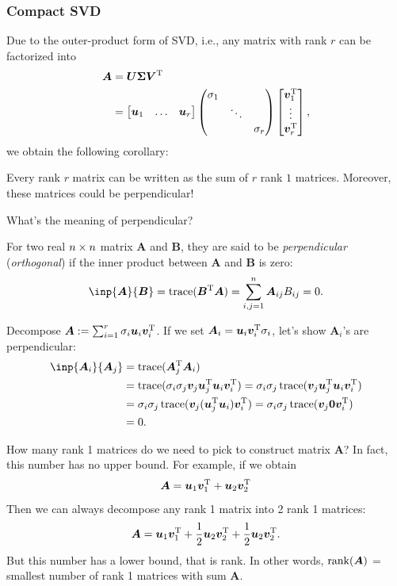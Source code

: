 \subsubsection{Compact SVD}
Due to the outer-product form of SVD, i.e., any matrix with rank $r$ can be factorized into
\begin{align*}
\bm A&=\bm U\bm\Sigma\bm V^{\mathrm T}\\
&=\begin{bmatrix}
\bm u_1&\dots&\bm u_r
\end{bmatrix}\begin{pmatrix}
\sigma_1&&\\&\ddots&\\&&\sigma_r
\end{pmatrix}\begin{bmatrix}
\bm v_1^{\mathrm T}\\\vdots\\\bm v_r^{\mathrm T}
\end{bmatrix},
\end{align*}
we obtain the following corollary:
\begin{corollary}
Every rank $r$ matrix can be written as the sum of $r$ rank $1$ matrices. Moreover, these matrices could be perpendicular!
\end{corollary}
What's the meaning of perpendicular?
\begin{definition}
For two real $n\times n$ matrix $\bm A$ and $\bm B$, they are said to be \emph{perpendicular} (\emph{orthogonal}) if the inner product between $\bm A$ and $\bm B$ is zero:
\[
\inp{\bm A}{\bm B}=\trace(\bm B\trans\bm A)=\sum_{i,j=1}^{n}\bm A_{ij}B_{ij}=0.
\]
\end{definition}
Decompose $\bm A:=\sum_{i=1}^{r}\sigma_i\bm u_i\bm v_i^{\mathrm T}$. If we set $\bm A_i=\bm u_i\bm v_i^{\mathrm T}\sigma_i$, let's show $\bm A_i$'s are perpendicular:
\begin{align*}
\inp{\bm A_i}{\bm A_j}&=\trace(\bm A_j\trans\bm A_i)\\
&=\trace(\sigma_i\sigma_j\bm v_j\bm u_j\trans\bm u_i\bm v_i\trans)=\sigma_i\sigma_j\trace(\bm v_j\bm u_j\trans\bm u_i\bm v_i\trans)\\
&=\sigma_i\sigma_j\trace(\bm v_j(\bm u_j\trans\bm u_i)\bm v_i\trans)=\sigma_i\sigma_j\trace(\bm v_j\bm 0\bm v_i\trans)\\
&=0.
\end{align*}

How many rank 1 matrices do we need to pick to construct matrix $\bm A$? In fact, this number has no upper bound. For example, if we obtain
\[
\bm A=\bm u_1\bm v_1^{\mathrm T}+\bm u_2\bm v_2^{\mathrm T}
\]
Then we can always decompose any rank 1 matrix into 2 rank 1 matrices:
\[
\bm A=\bm u_1\bm v_1^{\mathrm T}+\frac{1}{2}\bm u_2\bm v_2^{\mathrm T}+\frac{1}{2}\bm u_2\bm v_2^{\mathrm T}.
\]
But this number has a lower bound, that is rank. In other words, $\operatorname{rank}(\bm A)$ = smallest number of rank 1 matrices with sum $\bm A$.

